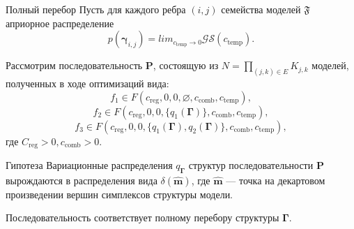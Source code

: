 \documentclass[usenames,dvipsnames,10pt,pdf,utf8,russian,aspectratio=43]{beamer}
\begin{document}
\begin{frame}{Полный перебор}
\small
Пусть для каждого ребра $(i,j)$ семейства моделей $\mathfrak{F}$ априорное распределение $$p(\boldsymbol{\gamma}_{i,j}) =  lim_{c_{\text{temp}} \to 0} \mathcal{GS}(c_{\text{temp}}).$$

Рассмотрим последовательность $\mathbf{P}$, состоящую из $N = \prod_{(j,k) \in E} K_{j,k}$ моделей, полученных в ходе оптимизаций вида:
$$f_1 \in F(c_{\text{reg}}, 0, 0, \varnothing, c_{\text{comb}},  c_{\text{temp}}),$$
$$f_2 \in F(c_{\text{reg}}, 0, 0, \{q_1(\boldsymbol{\Gamma})\},  c_{\text{comb}},  c_{\text{temp}}),$$
$$f_3 \in F(c_{\text{reg}}, 0, 0, \{q_1(\boldsymbol{\Gamma}), q_2(\boldsymbol{\Gamma})\},  c_{\text{comb}},  c_{\text{temp}}),$$
где $C_{\text{reg}} > 0,  c_{\text{comb}}>0$.


\begin{block}{Гипотеза}
Вариационные распределения $q_{\boldsymbol{\Gamma}}$ структур  последовательности $\mathbf{P}$ вырождаются в распределения вида $\delta(\hat{\mathbf{m}})$, где $\hat{\mathbf{m}}$ --- точка на декартовом произведении вершин симплексов структуры модели.

Последовательность соответствует полному перебору структуры $\boldsymbol{\Gamma}$.
\end{block}
\end{frame}
\end{document}
